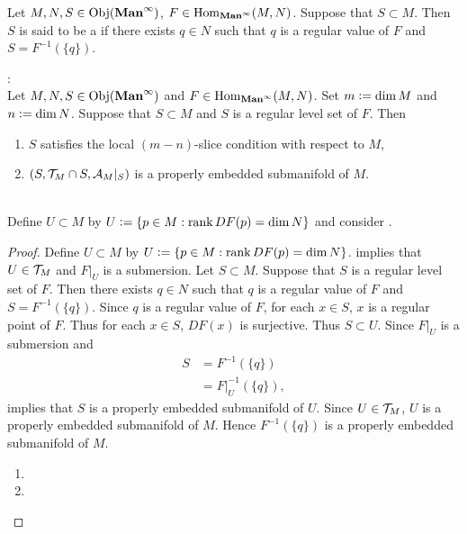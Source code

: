 \documentclass{book}
\begin{document}
	\begin{defn} 
		Let $M, N, S \in \operatorname{Obj}(\operatorname*{\text{\textbf{Man}}^{\infty}})$, $F \in \operatorname{Hom}_{\operatorname*{\text{\textbf{Man}}^{\infty}}}(M,N)$. Suppose that $S \subset M$. Then $S$ is said to be a  if there exists $q \in N$ such that $q$ is a regular value of $F$ and $S = F^{-1}(\{q\})$.
	\end{defn}
	
	\begin{ex}  : \\
		Let $M, N, S \in \operatorname{Obj}(\operatorname*{\text{\textbf{Man}}^{\infty}})$ and $F \in \operatorname{Hom}_{\operatorname*{\text{\textbf{Man}}^{\infty}}}(M,N)$. Set $m \vcentcolon= \dim M$ and $n \vcentcolon= \dim N$. Suppose that $S \subset M$ and $S$ is a regular level set of $F$. Then
		\begin{enumerate}
			\item $S$ satisfies the local $(m-n)$-slice condition with respect to $M$,
			\item $(S, \mathcal{T}_M \cap S, \mathcal{A}_M|_S)$ is a properly embedded submanifold of $M$.
		\end{enumerate}
		 \\
		Define $U \subset M$ by $U \vcentcolon= \{p \in M: \operatorname{\text{rank}} DF(p) = \dim N\}$ and consider .
	\end{ex}

	\begin{proof}
		Define $U \subset M$ by $U \vcentcolon= \{p \in M: \operatorname{\text{rank}} DF(p) = \dim N\}$.  implies that $U \in \mathcal{T}_M$ and $F|_U$ is a submersion. Let $S \subset M$. Suppose that $S$ is a regular level set of $F$. Then there exists $q \in N$ such that $q$ is a regular value of $F$ and $S = F^{-1}(\{q\})$. Since $q$ is a regular value of $F$, for each $x \in S$, $x$ is a regular point of $F$. Thus for each $x \in S$, $DF(x)$ is surjective. Thus $S \subset U$. Since $F|_U$ is a submersion and 
		\begin{align*}
			S
			& = F^{-1}(\{q\}) \\
			& = F|_U^{-1}(\{q\}),
		\end{align*}
		\rex{}  implies that $S$ is a properly embedded submanifold of $U$. Since $U \in \mathcal{T}_M$, $U$ is a properly embedded submanifold of $M$. Hence $F^{-1}(\{q\})$ is a properly embedded submanifold of $M$. 
		\begin{enumerate}
			\item 
			\item 
		\end{enumerate}
	\end{proof}
\end{document}
